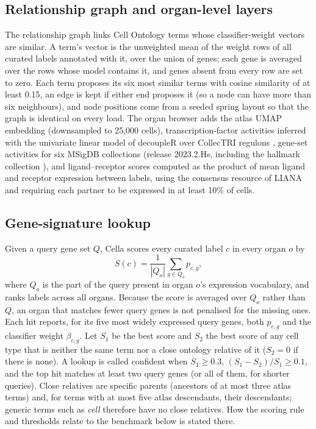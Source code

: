 \documentclass[11pt]{article}
\newcommand{\cella}{Cella}
\begin{document}
\subsection{Relationship graph and organ-level layers}

The relationship graph links Cell Ontology terms whose classifier-weight vectors are similar. A term's vector is the unweighted mean of the weight rows of all curated labels annotated with it, over the union of genes; each gene is averaged over the rows whose model contains it, and genes absent from every row are set to zero. Each term proposes its six most similar terms with cosine similarity of at least 0.15, an edge is kept if either end proposes it (so a node can have more than six neighbours), and node positions come from a seeded spring layout so that the graph is identical on every load. The organ browser adds the atlas UMAP embedding (downsampled to 25{,}000 cells), transcription-factor activities inferred with the univariate linear model of decoupleR \cite{badia2022} over CollecTRI regulons \cite{mullerdott2023}, gene-set activities for six MSigDB collections (release 2023.2.Hs, including the hallmark collection \cite{liberzon2015}), and ligand--receptor scores computed as the product of mean ligand and receptor expression between labels, using the consensus resource of LIANA \cite{dimitrov2022} and requiring each partner to be expressed in at least 10\% of cells.

\subsection{Gene-signature lookup}

Given a query gene set $Q$, \cella{} scores every curated label $c$ in every organ $o$ by
\begin{equation}
S(c) = \frac{1}{|Q_o|} \sum_{g \in Q_o} p_{c,g},
\end{equation}
where $Q_o$ is the part of the query present in organ $o$'s expression vocabulary, and ranks labels across all organs. Because the score is averaged over $Q_o$ rather than $Q$, an organ that matches fewer query genes is not penalised for the missing ones. Each hit reports, for its five most widely expressed query genes, both $p_{c,g}$ and the classifier weight $\beta_{c,g}$. Let $S_1$ be the best score and $S_2$ the best score of any cell type that is neither the same term nor a close ontology relative of it ($S_2 = 0$ if there is none). A lookup is called confident when $S_1 \geq 0.3$, $(S_1 - S_2)/S_1 \geq 0.1$, and the top hit matches at least two query genes (or all of them, for shorter queries). Close relatives are specific parents (ancestors of at most three atlas terms) and, for terms with at most five atlas descendants, their descendants; generic terms such as \emph{cell} therefore have no close relatives. How the scoring rule and thresholds relate to the benchmark below is stated there.
\end{document}
